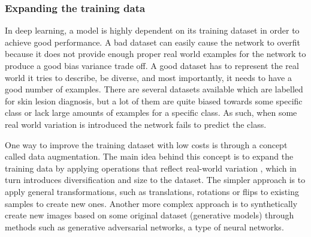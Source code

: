 \subsubsection{Expanding the training data}
In deep learning, a model is highly dependent on its training dataset in order to achieve good performance. A bad dataset can easily cause the network to overfit because it does not provide enough proper real world examples for the network to produce a good bias variance trade off. A good dataset has to represent the real world it tries to describe, be diverse, and most importantly, it needs to have a good number of examples.
There are several datasets available which are labelled for skin lesion diagnosis, but a lot of them are quite biased towards some specific class or lack large amounts of examples for a specific class. As such, when some real world variation is introduced the network fails to predict the class. \par
One way to improve the training dataset with low costs is through a concept called data augmentation. The main idea behind this concept is to expand the training data by applying operations that reflect real-world variation \cite{Nielsen2017a}, which in turn introduces diversification and size to the dataset. The simpler approach is to apply general transformations, such as translations, rotations or flips to existing samples to create new ones. Another more complex approach is to synthetically create new images based on some original dataset (generative models) through methods such as generative adversarial networks, a type of neural networks.
